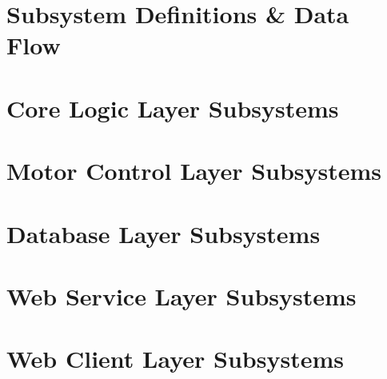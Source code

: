 \documentclass[11pt,letterpaper]{article}
\begin{document}
\section{Subsystem Definitions \& Data Flow}

\newpage
\section{Core Logic Layer Subsystems}

\newpage
\section{Motor Control Layer Subsystems}

\newpage
\section{Database Layer Subsystems}

\newpage
\section{Web Service Layer Subsystems}

\newpage
\section{Web Client Layer Subsystems}

\newpage



{}
\end{document}
